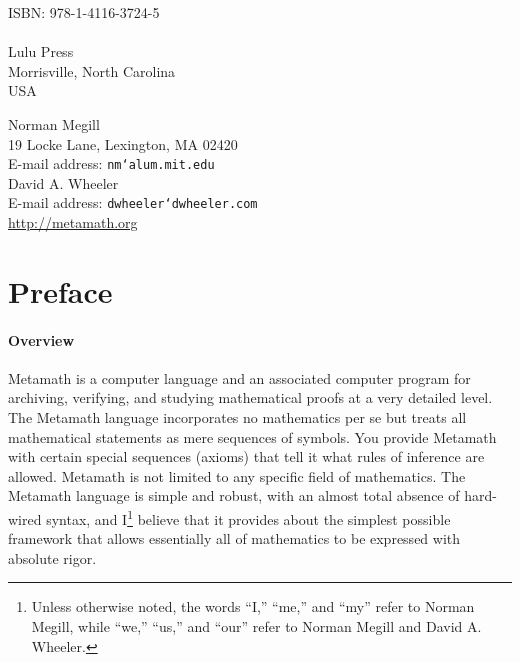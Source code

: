 \begin{center}
\vspace{7ex}
ISBN: 978-1-4116-3724-5 \\
{\ } \\
Lulu Press \\
Morrisville, North Carolina\\
USA


\hfill
\vfill

Norman Megill\\ 19 Locke Lane, Lexington, MA 02420 \\
E-mail address: \texttt{nm{\char`\@}alum.mit.edu} \\
\vspace{7ex}
David A. Wheeler \\
E-mail address: \texttt{dwheeler{\char`\@}dwheeler.com} \\
\vspace{7ex}
\url{http://metamath.org}
\end{center}

%
%
%
%

\tableofcontents

\chapter*{Preface}



\subsubsection{Overview}

Metamath is a computer language and an associated computer
program for archiving, verifying, and studying mathematical proofs at a very
detailed level.  The Metamath language incorporates no mathematics per se but
treats all mathematical statements as mere sequences of symbols.  You provide
Metamath with certain special sequences (axioms) that tell it what rules
of inference are allowed.  Metamath is not limited to any specific field of
mathematics.  The Metamath language is simple and robust, with an
almost total absence of hard-wired syntax, and 
I\footnote{Unless otherwise noted, the words
``I,'' ``me,'' and ``my'' refer to Norman Megill, while
``we,'' ``us,'' and ``our'' refer to Norman Megill and
David A. Wheeler.}
believe that it
provides about the simplest possible framework that allows essentially all of
mathematics to be expressed with absolute rigor.

